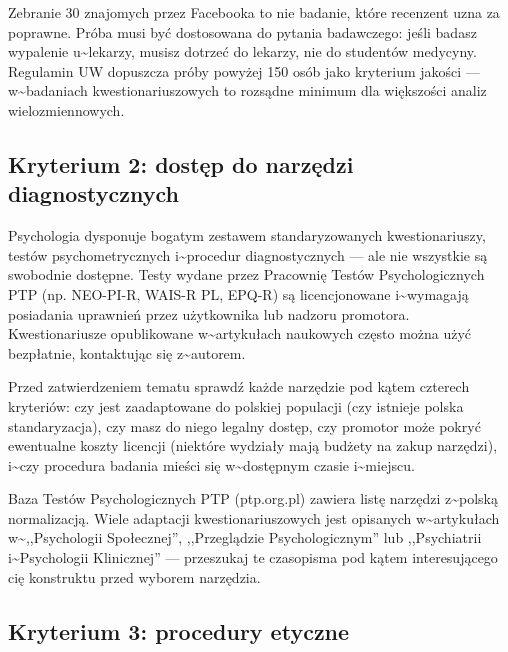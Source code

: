 \documentclass[12pt,a4paper,twoside,openany]{book}
\begin{document}
\begin{warningbox} Zebranie 30 znajomych przez Facebooka to nie badanie, które recenzent uzna za poprawne. Próba musi być dostosowana do pytania badawczego: jeśli badasz wypalenie u\textasciitilde{}lekarzy, musisz dotrzeć do lekarzy, nie do studentów medycyny. Regulamin UW dopuszcza próby powyżej 150 osób jako kryterium jakości --- w\textasciitilde{}badaniach kwestionariuszowych to rozsądne minimum dla większości analiz wielozmiennowych.
\end{warningbox}


\subsection{Kryterium 2: dostęp do narzędzi diagnostycznych}


Psychologia dysponuje bogatym zestawem standaryzowanych kwestionariuszy, testów psychometrycznych i\textasciitilde{}procedur diagnostycznych --- ale nie wszystkie są swobodnie dostępne. Testy wydane przez Pracownię Testów Psychologicznych PTP (np. NEO-PI-R, WAIS-R PL, EPQ-R) są licencjonowane i\textasciitilde{}wymagają posiadania uprawnień przez użytkownika lub nadzoru promotora. Kwestionariusze opublikowane w\textasciitilde{}artykułach naukowych często można użyć bezpłatnie, kontaktując się z\textasciitilde{}autorem.


Przed zatwierdzeniem tematu sprawdź każde narzędzie pod kątem czterech kryteriów: czy jest zaadaptowane do polskiej populacji (czy istnieje polska standaryzacja), czy masz do niego legalny dostęp, czy promotor może pokryć ewentualne koszty licencji (niektóre wydziały mają budżety na zakup narzędzi), i\textasciitilde{}czy procedura badania mieści się w\textasciitilde{}dostępnym czasie i\textasciitilde{}miejscu.


\begin{tipbox} Baza Testów Psychologicznych PTP (ptp.org.pl) zawiera listę narzędzi z\textasciitilde{}polską normalizacją. Wiele adaptacji kwestionariuszowych jest opisanych w\textasciitilde{}artykułach w\textasciitilde{},,Psychologii Społecznej'', ,,Przeglądzie Psychologicznym'' lub ,,Psychiatrii i\textasciitilde{}Psychologii Klinicznej'' --- przeszukaj te czasopisma pod kątem interesującego cię konstruktu przed wyborem narzędzia.
\end{tipbox}


\subsection{Kryterium 3: procedury etyczne}
\end{document}

